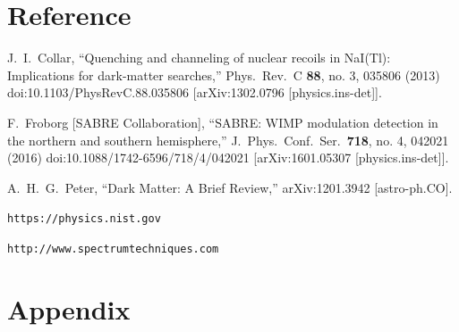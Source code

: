 \documentclass[12pt]{article}
\begin{document}
	\section{Reference}
	\begin{thebibliography}{9}
		J.~I.~Collar,
		``Quenching and channeling of nuclear recoils in NaI(Tl): Implications for dark-matter searches,''
		Phys.\ Rev.\ C {\bf 88}, no. 3, 035806 (2013)
		doi:10.1103/PhysRevC.88.035806
		[arXiv:1302.0796 [physics.ins-det]].
		
		F.~Froborg [SABRE Collaboration],
		``SABRE: WIMP modulation detection in the northern and southern hemisphere,''
		J.\ Phys.\ Conf.\ Ser.\  {\bf 718}, no. 4, 042021 (2016)
		doi:10.1088/1742-6596/718/4/042021
		[arXiv:1601.05307 [physics.ins-det]].
		
		A.~H.~G.~Peter,
		``Dark Matter: A Brief Review,''
		arXiv:1201.3942 [astro-ph.CO].
		
		\texttt{https://physics.nist.gov}
		
		\texttt{http://www.spectrumtechniques.com}
		
	\end{thebibliography}
	
	
	\section{Appendix}
\end{document}

